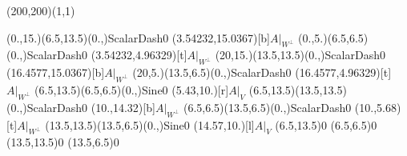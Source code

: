 \unitlength=1bp%

\begin{feynartspicture}(200,200)(1,1)

\FADiagram{}
\FAProp(0.,15.)(6.5,13.5)(0.,){ScalarDash}{0}
\FALabel(3.54232,15.0367)[b]{$A|_{W^\perp}$}
\FAProp(0.,5.)(6.5,6.5)(0.,){ScalarDash}{0}
\FALabel(3.54232,4.96329)[t]{$A|_{W^\perp}$}
\FAProp(20,15.)(13.5,13.5)(0.,){ScalarDash}{0}
\FALabel(16.4577,15.0367)[b]{$A|_{W^\perp}$}
\FAProp(20,5.)(13.5,6.5)(0.,){ScalarDash}{0}
\FALabel(16.4577,4.96329)[t]{$A|_{W^\perp}$}
\FAProp(6.5,13.5)(6.5,6.5)(0.,){Sine}{0}
\FALabel(5.43,10.)[r]{$A|_V$}
\FAProp(6.5,13.5)(13.5,13.5)(0.,){ScalarDash}{0}
\FALabel(10.,14.32)[b]{$A|_{W^\perp}$}
\FAProp(6.5,6.5)(13.5,6.5)(0.,){ScalarDash}{0}
\FALabel(10.,5.68)[t]{$A|_{W^\perp}$}
\FAProp(13.5,13.5)(13.5,6.5)(0.,){Sine}{0}
\FALabel(14.57,10.)[l]{$A|_V$}
\FAVert(6.5,13.5){0}
\FAVert(6.5,6.5){0}
\FAVert(13.5,13.5){0}
\FAVert(13.5,6.5){0}
\end{feynartspicture}

